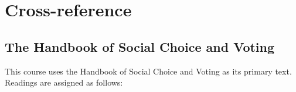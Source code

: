 
\chapter{Cross-reference}




\section{The Handbook of Social Choice and Voting}

This course uses the Handbook of Social Choice and Voting \autocite{Heckelman2015} as its primary text.  Readings are assigned as follows:

